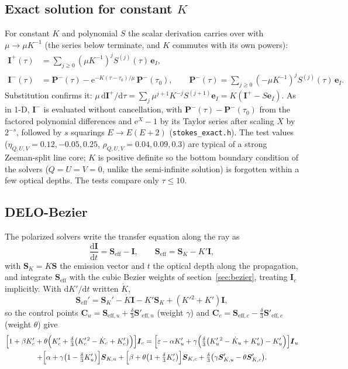 \documentclass[11pt,a4paper]{article}
\newcommand{\code}[1]{\texttt{#1}}
\newcommand{\dd}{\mathrm{d}}
\newcommand{\e}{\mathrm{e}}
\newcommand{\Kp}{K'}
\newcommand{\vI}{\boldsymbol{I}}
\newcommand{\vS}{\boldsymbol{S}}
\newcommand{\vP}{\boldsymbol{P}}
\newcommand{\eI}{\boldsymbol{e}_I}
\begin{document}
\subsection[Exact solution for constant K]{Exact solution for constant $K$}
For constant $K$ and polynomial $S$ the scalar derivation carries over
with $\mu\to\mu K^{-1}$ (the series below terminate, and $K$ commutes
with its own powers):
\begin{align}
\vI^+(\tau) &= \sum_{j\ge0}(\mu K^{-1})^j S^{(j)}(\tau)\,\eI, \\
\vI^-(\tau) &= \vP^-(\tau) - \e^{-K(\tau-\tau_0)/\mu}\,\vP^-(\tau_0),\qquad
\vP^-(\tau) = \sum_{j\ge0}(-\mu K^{-1})^j S^{(j)}(\tau)\,\eI .
\end{align}
Substitution confirms it: $\mu\,\dd\vI^+/\dd\tau =
\sum_j\mu^{j+1}K^{-j}S^{(j+1)}\eI = K(\vI^+-S\eI)$. As in 1-D,
$\vI^-$ is evaluated without cancellation, with
$\vP^-(\tau)-\vP^-(\tau_0)$ from the factored polynomial differences and
$\e^X-1$ by its Taylor series after scaling $X$ by $2^{-s}$, followed by
$s$ squarings $E\to E(E+2)$ (\code{stokes\_exact.h}). The test values
($\eta_{Q,U,V} = 0.12, -0.05, 0.25$, $\rho_{Q,U,V} = 0.04, 0.09, 0.3$)
are typical of a strong Zeeman-split line core; $K$ is positive definite
so the bottom boundary condition of the solvers ($Q=U=V=0$, unlike the
semi-infinite solution) is forgotten within a few optical depths. The
tests compare only $\tau\le10$.

\subsection{DELO-Bezier}
The polarized solvers \citep[DELO;][]{1989ApJ...339.1093R} write the transfer equation along the ray as
\begin{equation}
\frac{\dd\vI}{\dd t} = \vS_\text{eff} - \vI,\qquad
\vS_\text{eff} = \vS_K - \Kp\vI,
\end{equation}
with $\vS_K = K\vS$ the emission vector and $t$ the optical depth along
the propagation, and integrate $\vS_\text{eff}$ with the cubic Bezier
weights of section~\ref{sec:bezier}, treating $\vI_c$ implicitly. With
$\dd\Kp/\dd t$ written $\dot K$,
\begin{equation}
\vS_\text{eff}' = \vS_K' - \dot K\vI - \Kp\vS_K + (\Kp{}^2+\Kp)\vI,
\end{equation}
so the control points
$\boldsymbol C_u = \vS_{\text{eff},u}+\tfrac\delta3\vS'_{\text{eff},u}$
(weight $\gamma$) and
$\boldsymbol C_c = \vS_{\text{eff},c}-\tfrac\delta3\vS'_{\text{eff},c}$
(weight $\theta$) give
\begin{multline}
\Bigl[1+\beta\Kp_c+\theta\Bigl(\Kp_c+\tfrac\delta3\bigl(\Kp_c{}^2-\dot K_c+\Kp_c\bigr)\Bigr)\Bigr]\vI_c
= \Bigl[\varepsilon-\alpha\Kp_u+\gamma\Bigl(\tfrac\delta3\bigl(\Kp_u{}^2-\dot K_u+\Kp_u\bigr)-\Kp_u\Bigr)\Bigr]\vI_u\\
+ \Bigl[\alpha+\gamma\bigl(1-\tfrac\delta3\Kp_u\bigr)\Bigr]\vS_{K,u}
+ \Bigl[\beta+\theta\bigl(1+\tfrac\delta3\Kp_c\bigr)\Bigr]\vS_{K,c}
+ \tfrac\delta3\bigl(\gamma\vS'_{K,u}-\theta\vS'_{K,c}\bigr).
\end{multline}
\end{document}
